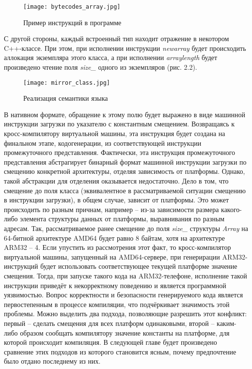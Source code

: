 \begin{figure}[H]
    \centering
    \texttt{[image: bytecodes\_array.jpg]}
    \caption{Пример инструкций в программе}
\end{figure}

С другой стороны, каждый встроенный тип находит отражение в некотором C++-классе. При этом, при исполнении инструкции \textit{newarray} будет происходить аллокация экземпляра этого класса, а при исполнении \textit{arraylength} будет произведено чтение поля \textit{size\_} одного из экземпляров (рис. 2.2).

\begin{figure}[H]
    \centering
    \texttt{[image: mirror\_class.jpg]}
    \caption{Реализация семантики языка}
\end{figure}

В нативном формате, обращение к этому полю будет выражено в виде машинной инструкции загрузки по указателю с константным смещением.
Возвращаясь к кросс-компилятору виртуальной машины, эта инструкция будет создана на финальном этапе, кодогенерации, из соответствующей инструкции промежуточного представления.
Фактически, эта инструкция промежуточного представления абстрагирует бинарный формат машинной инструкции загрузки по смещению конкретной архитектуры, отделяя зависимость от платформы.
Однако, такой абстракции для отделения оказывается недостаточно.
Дело в том, что смещение до поля класса (эквивалентное в рассматриваемой ситуации смещению в инструкции загрузки), в общем случае, зависит от платформы.
Это может происходить по разным причнам, например -- из-за зависимости размера какого-либо элемента структуры данных от платформы, выравнивания по разным адресам.
Так, рассматриваемое ранее смещение до поля \textit{size\_} структуры \textit{Array} на 64-битной архитектуре AMD64 будет равно 8 байтам, хотя на архитектуре ARM32 -- 4.
Если упустить из рассмотрения этот факт, то кросс-компилятор виртуальной машины, запущенный на AMD64-сервере, при генерирации ARM32-инструкций будет использовать соответствующее текущей платформе значение смещения.
Тогда, при запуске такого кода на ARM32-телефоне, исполнение такой инструкции приведёт к некорректному поведению и является программной уязвимостью.
Вопрос корректности и безопасности генерируемого кода является первостепенным в процессе компиляции, что подчёркивает значимость этой проблемы.
Можно выделить два подхода, позволяющие разрешить этот конфликт: первый -- сделать смещения для всех платформ одинаковыми, второй -- каким-либо образом сообщать компилятору значение константы на платформе, для которой происходит компиляция. В следующей главе будет произведено сравнение этих подходов из которого становится ясным, почему предпочтение было отдано последнему из них. 

\newpage
